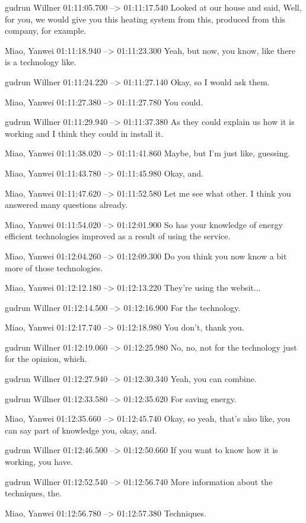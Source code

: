 {gudrun Willner 01:11:05.700 --> 01:11:17.540
Looked at our house and said, Well, for you, we would give you this heating system from this, produced from this company, for example.

Miao, Yanwei 01:11:18.940 --> 01:11:23.300
Yeah, but now, you know, like there is a technology like.

gudrun Willner 01:11:24.220 --> 01:11:27.140
Okay, so I would ask them.

Miao, Yanwei 01:11:27.380 --> 01:11:27.780
You could.

gudrun Willner 01:11:29.940 --> 01:11:37.380
As they could explain us how it is working and I think they could in install it.

Miao, Yanwei 01:11:38.020 --> 01:11:41.860
Maybe, but I'm just like, guessing.

Miao, Yanwei 01:11:43.780 --> 01:11:45.980
Okay, and.

Miao, Yanwei 01:11:47.620 --> 01:11:52.580
Let me see what other. I think you answered many questions already.

Miao, Yanwei 01:11:54.020 --> 01:12:01.900
So has your knowledge of energy efficient technologies improved as a result of using the service.

Miao, Yanwei 01:12:04.260 --> 01:12:09.300
Do you think you now know a bit more of those technologies.

Miao, Yanwei 01:12:12.180 --> 01:12:13.220
They're using the websit...

gudrun Willner 01:12:14.500 --> 01:12:16.900
For the technology.

Miao, Yanwei 01:12:17.740 --> 01:12:18.980
You don't, thank you.

gudrun Willner 01:12:19.060 --> 01:12:25.980
No, no, not for the technology just for the opinion, which.

gudrun Willner 01:12:27.940 --> 01:12:30.340
Yeah, you can combine.

gudrun Willner 01:12:33.580 --> 01:12:35.620
For saving energy.

Miao, Yanwei 01:12:35.660 --> 01:12:45.740
Okay, so yeah, that's also like, you can say part of knowledge you, okay, and.

gudrun Willner 01:12:46.500 --> 01:12:50.660
If you want to know how it is working, you have.

gudrun Willner 01:12:52.540 --> 01:12:56.740
More information about the techniques, the.

Miao, Yanwei 01:12:56.780 --> 01:12:57.380
Techniques.

}
